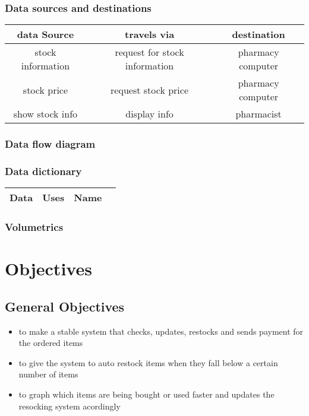 \subsubsection{Data sources and destinations}
\begin{table}
\begin{flushleft}
\begin{tabular}{|c|c|c|}
\hline\hline
data Source & travels via & destination\\
\hline
stock information & request for stock information & pharmacy computer\\
\hline
stock price & request stock price & pharmacy computer\\
\hline
show stock info & display info & pharmacist\\ 
\hline
\end{tabular}
\label{table:nonlin}
\end{flushleft}
\end{table}
\subsubsection{Data flow diagram}

\subsubsection{Data dictionary}
\begin{table}
\begin{flushleft}
\begin{tabular}{|c|c|c|c|}
\hline
Data & Uses & Name \\
\hline

\end{tabular}
\label{table:nonlin}
\end{flushleft}
\end{table}

\subsubsection{Volumetrics}

\section{Objectives}

\subsection{General Objectives}
\begin{itemize}
	\item to make a stable system that checks, updates, restocks and sends payment for the ordered items
	\item to give the system to auto restock items when they fall below a certain number of items
	\item to graph which items are being bought or used faster and updates the resocking system acordingly 
\end{itemize}
